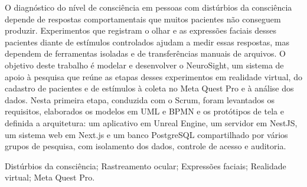 \documentclass[conference,a4paper,10pt]{IEEEtran}
\begin{document}
\thispagestyle{plain}
\pagestyle{plain}

\begin{resumo}
O diagnóstico do nível de consciência em pessoas com distúrbios da consciência depende de respostas comportamentais que muitos pacientes não conseguem produzir. Experimentos que registram o olhar e as expressões faciais desses pacientes diante de estímulos controlados ajudam a medir essas respostas, mas dependem de ferramentas isoladas e de transferências manuais de arquivos. O objetivo deste trabalho é modelar e desenvolver o NeuroSight, um sistema de apoio à pesquisa que reúne as etapas desses experimentos em realidade virtual, do cadastro de pacientes e de estímulos à coleta no Meta Quest Pro e à análise dos dados. Nesta primeira etapa, conduzida com o Scrum, foram levantados os requisitos, elaborados os modelos em UML e BPMN e os protótipos de tela e definida a arquitetura: um aplicativo em Unreal Engine, um servidor em NestJS, um sistema web em Next.js e um banco PostgreSQL compartilhado por vários grupos de pesquisa, com isolamento dos dados, controle de acesso e auditoria.
\end{resumo}

\begin{palavraschave}
Distúrbios da consciência; Rastreamento ocular; Expressões faciais; Realidade virtual; Meta Quest Pro.
\end{palavraschave}

\begin{abstract}
The diagnosis of the level of consciousness in people with disorders of consciousness depends on behavioral responses that many patients cannot produce. Experiments that record these patients' gaze and facial expressions in response to controlled stimuli help to measure such responses, but they rely on isolated tools and manual file transfers. The objective of this work is to model and develop NeuroSight, a research support system that brings together the steps of these virtual reality experiments, from registering patients and stimuli to data collection with the Meta Quest Pro and data analysis. In this first stage, carried out with Scrum, the requirements were gathered, the UML and BPMN models and the screen prototypes were produced, and the architecture was defined: an Unreal Engine application, a NestJS server, a Next.js web system, and a PostgreSQL database shared by multiple research groups, with data isolation, access control, and auditing.
\end{abstract}
\end{document}
